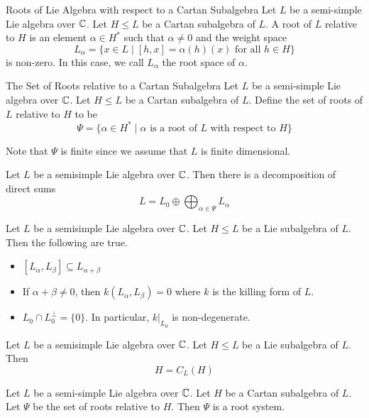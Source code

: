 \documentclass[a4paper]{article}
\begin{document}
\begin{defn}{Roots of Lie Algebra with respect to a Cartan Subalgebra}{} Let $L$ be a semi-simple Lie algebra over $\mathbb{C}$. Let $H\leq L$ be a Cartan subalgebra of $L$. A root of $L$ relative to $H$ is an element $\alpha\in H^\ast$ such that $\alpha\neq 0$ and the weight space $$L_\alpha=\{x\in L\;|\;[h,x]=\alpha(h)(x)\text{ for all }h\in H\}$$ is non-zero. In this case, we call $L_\alpha$ the root space of $\alpha$. 
\end{defn}

\begin{defn}{The Set of Roots relative to a Cartan Subalgebra}{} Let $L$ be a semi-simple Lie algebra over $\mathbb{C}$. Let $H\leq L$ be a Cartan subalgebra of $L$. Define the set of roots of $L$ relative to $H$ to be $$\Psi=\{\alpha\in H^\ast\;|\;\alpha\text{ is a root of }L\text{ with respect to }H\}$$
\end{defn}

Note that $\Psi$ is finite since we assume that $L$ is finite dimensional. 

\begin{lmm}{}{} Let $L$ be a semisimple Lie algebra over $\mathbb{C}$. Then there is a decomposition of direct sums $$L=L_0\oplus\bigoplus_{\alpha\in\Psi}L_\alpha$$
\end{lmm}

\begin{prp}{}{} Let $L$ be a semisimple Lie algebra over $\mathbb{C}$. Let $H\leq L$ be a Lie subalgebra of $L$. Then the following are true. 
\begin{itemize}
\item $[L_\alpha,L_\beta]\subseteq L_{\alpha+\beta}$
\item If $\alpha+\beta\neq 0$, then $k(L_\alpha,L_\beta)=0$ where $k$ is the killing form of $L$. 
\item $L_0\cap L_0^\perp=\{0\}$. In particular, $k|_{L_0}$ is non-degenerate. 
\end{itemize}
\end{prp}

\begin{prp}{}{} Let $L$ be a semisimple Lie algebra over $\mathbb{C}$. Let $H\leq L$ be a Lie subalgebra of $L$. Then $$H=C_L(H)$$
\end{prp}

\begin{prp}{}{} Let $L$ be a semi-simple Lie algebra over $\mathbb{C}$. Let $H$ be a Cartan subalgebra of $L$. Let $\Psi$ be the set of roots relative to $H$. Then $\Psi$ is a root system. 
\end{prp}
\end{document}
